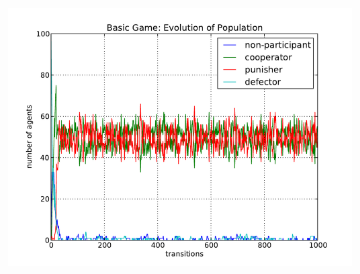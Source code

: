 \documentclass[11pt]{article}
\begin{document}
\begin{figure}[!h]
\begin{subfigure}{1\textwidth}
    \includegraphics[scale = 0.4]{3.pdf}
  \end{subfigure}
\end{figure}
\end{document}
